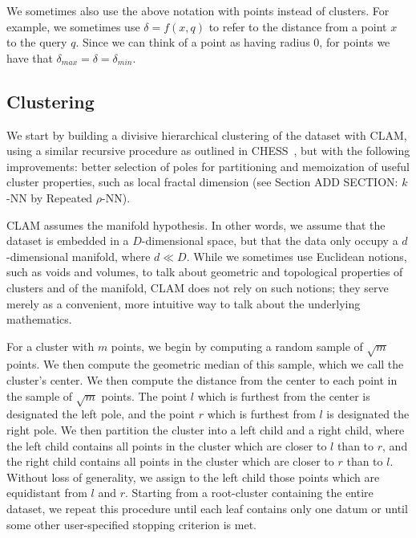 We sometimes also use the above notation with points instead of clusters. For example, we sometimes use $\delta = f(x, q)$ to refer to the distance 
from a point $x$ to the query $q$. Since we can think of a point as having radius 0, for points we have that $\delta_{max} = \delta = \delta_{min}$.


\subsection{Clustering}
\label{subsec:methods:clustering}

We start by building a divisive hierarchical clustering of the dataset with CLAM, using a 
similar recursive procedure as outlined in CHESS~\cite{ishaq2019clustered}, but with the following 
improvements: better selection of poles for partitioning and memoization of useful cluster properties, 
such as local fractal dimension (see Section ADD SECTION: $k$-NN by Repeated $\rho$-NN). 


CLAM assumes the manifold hypothesis. 
In other words, we assume that the dataset is embedded in a $D$-dimensional space, but that the data only occupy 
a $d$-dimensional manifold, where $d \ll D$. 
While we sometimes use Euclidean notions, such as voids and volumes, to talk about geometric and topological 
properties of clusters and of the manifold, CLAM does not rely on such notions; 
they serve merely as a convenient, more intuitive way to talk about the underlying mathematics.


For a cluster with $m$ points, we begin by computing a 
random sample of $\sqrt m$ points. We then compute the geometric median of this sample, which we call the 
cluster's center. We then compute the distance from the center to each point in the sample of $\sqrt m$ points. 
The point $l$ which is furthest from the center is designated the left pole, and the point $r$ which is furthest
from $l$ is designated the right pole. We then partition the cluster into a left child and a right child, where the 
left child contains all points in the cluster which are closer to $l$ than to $r$, and the right child contains all 
points in the cluster which are closer to $r$ than to $l$. Without loss of generality, we assign to the left child 
those points which are equidistant from $l$ and $r$. Starting from a root-cluster containing the entire dataset, we 
repeat this procedure until each leaf contains only one datum or until some other user-specified stopping criterion 
is met.


